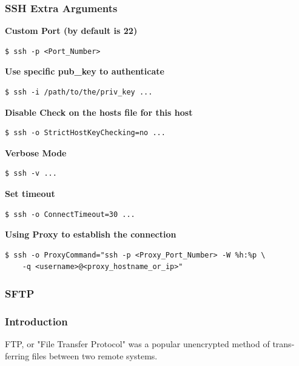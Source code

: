 \documentclass{article}
\newenvironment{codetemplate}[1][]{%
  \mybasecolorbox[#1]
  \itshape
}{%
  \endmybasecolorbox
}
\begin{document}
\subsubsection{SSH Extra Arguments}

\textbf{Custom Port (by default is 22)}
\begin{codetemplate}{}
\begin{verbatim}
$ ssh -p <Port_Number>
\end{verbatim}
\end{codetemplate}

\textbf{Use specific pub\_key to authenticate}
\begin{codetemplate}{}
\begin{verbatim}
$ ssh -i /path/to/the/priv_key ...
\end{verbatim}
\end{codetemplate}

\textbf{Disable Check on the hosts file for this host}
\begin{codetemplate}{}
\begin{verbatim}
$ ssh -o StrictHostKeyChecking=no ...
\end{verbatim}
\end{codetemplate}

\textbf{Verbose Mode}
\begin{codetemplate}{}
\begin{verbatim}
$ ssh -v ...
\end{verbatim}
\end{codetemplate}

\textbf{Set timeout}
\begin{codetemplate}{}
\begin{verbatim}
$ ssh -o ConnectTimeout=30 ...
\end{verbatim}
\end{codetemplate}

\textbf{Using Proxy to establish the connection}
\begin{codetemplate}{}
\begin{verbatim}
$ ssh -o ProxyCommand="ssh -p <Proxy_Port_Number> -W %h:%p \
    -q <username>@<proxy_hostname_or_ip>"
\end{verbatim}
\end{codetemplate}

\subsubsection{SFTP}

\subsubsection{Introduction}
FTP, or "File Transfer Protocol" was a popular unencrypted method of trans-
ferring files between two remote systems.
\end{document}
